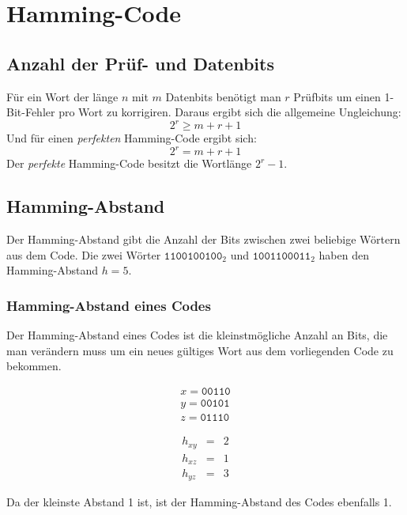 \section{Hamming-Code}

\subsection{Anzahl der Prüf- und Datenbits}
Für ein Wort der länge $n$ mit $m$ Datenbits benötigt man $r$ Prüfbits um einen 1-Bit-Fehler 
pro Wort zu korrigiren.
Daraus ergibt sich die allgemeine Ungleichung:
\[
 2^{r} \geq m + r + 1
\]
Und für einen \emph{perfekten} Hamming-Code ergibt sich:
\[
 2^{r} = m + r + 1
\]
Der \emph{perfekte} Hamming-Code besitzt die Wortlänge $2^{r} - 1$.

\subsection{Hamming-Abstand}
Der Hamming-Abstand gibt die Anzahl der Bits zwischen zwei beliebige Wörtern aus dem Code.
\example
Die zwei Wörter $\texttt{1100100100}_2$ und $\texttt{1001100011}_2$ haben den 
Hamming-Abstand $h = 5$.

\subsubsection*{Hamming-Abstand eines Codes}
Der Hamming-Abstand eines Codes ist die kleinstmögliche Anzahl an Bits, die man verändern
muss um ein neues gültiges Wort aus dem vorliegenden Code zu bekommen.
\example
\begin{center}
 \begin{minipage}{.35\linewidth}
    \begin{align*}
        x = \texttt{00110}  \\
        y = \texttt{00101}  \\
        z = \texttt{01110}
    \end{align*}
\end{minipage}
\begin{minipage}{.35\linewidth}
    \begin{eqnarray*}
        h_{xy} &=& 2    \\
        h_{xz} &=& 1    \\
        h_{yz} &=& 3
    \end{eqnarray*}
\end{minipage}
\end{center} \par
Da der kleinste Abstand 1 ist, ist der Hamming-Abstand des Codes ebenfalls 1.

